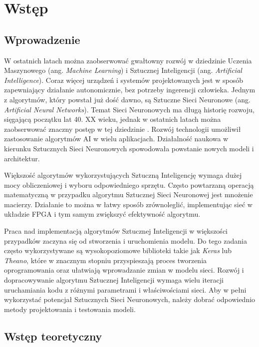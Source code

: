 \newpage %
\cleardoublepage %
\pagestyle{headings}
\section{Wstęp}

\subsection{Wprowadzenie}

W ostatnich latach można zaobserwować gwałtowny rozwój w dziedzinie 
Uczenia Maszynowego (ang. \emph{Machine Learning}) i Sztucznej Inteligencji 
(ang. \emph{Artificial Intelligence}). Coraz więcej urządzeń i systemów projektowanych jest w sposób zapewniający działanie autonomicznie, bez potrzeby ingerencji człowieka. 
Jednym z algorytmów, który powstał już dość dawno, są Sztuczne Sieci Neuronowe (ang. \emph{Artificial Neural Networks}). Temat Sieci Neuronowych ma długą historię rozwoju, sięgającą początku lat 40. XX wieku, jednak w ostatnich latach można zaobserwować znaczny postęp w tej dziedzinie \cite{Kriesel2007NeuralNetworks}. Rozwój technologii umożliwił zastosowanie algorytmów AI w wielu aplikacjach. Działalność naukowa w kierunku Sztucznych Sieci Neuronowych spowodowała powstanie nowych modeli i architektur.

Większość algorytmów wykorzystujących Sztuczną Inteligencję wymaga dużej mocy 
obliczeniowej i wyboru odpowiedniego sprzętu. Często powtarzaną operacją matematyczną 
w przypadku algorytmu Sztucznej Sieci Neuronowej jest mnożenie macierzy.
Działanie to można w łatwy sposób zrównoleglić, implementując sieć w układzie 
FPGA i tym samym zwiększyć efektywność algorytmu.

Praca nad implementacją algorytmów Sztucznej Inteligencji w większości 
przypadków zaczyna się od stworzenia i uruchomienia modelu. Do tego zadania 
często wykorzystywane są wysokopoziomowe biblioteki takie jak \emph{Keras} lub \emph{Theano}, które w znacznym stopniu przyspieszają proces tworzenia oprogramowania oraz ułatwiają wprowadzanie zmian w modelu sieci. Rozwój i dopracowywanie 
algorytmu Sztucznej Inteligencji wymaga wielu iteracji uruchamiania kodu 
z różnymi parametrami i właściwościami sieci. Aby w pełni wykorzystać potencjał Sztucznych Sieci Neuronowych, należy dobrać odpowiednio metody projektowania i testowania modeli.

\subsection{Wstęp teoretyczny}

